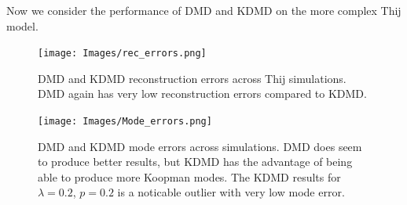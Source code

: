 


\FloatBarrier

Now we consider the performance of DMD and KDMD on the more complex Thij model.


\begin{figure}
    \texttt{[image: Images/rec\_errors.png]}
    \centering
    \caption{DMD and KDMD reconstruction errors across Thij simulations. DMD again
    has very low reconstruction errors compared to KDMD.}
\end{figure}

\begin{figure}
    \texttt{[image: Images/Mode\_errors.png]}
    \centering
    \caption{DMD and KDMD mode errors across simulations. DMD does seem to produce 
    better results, but KDMD has the advantage of being able to produce more Koopman modes. The
    KDMD results for $\lambda=0.2$, $p=0.2$ is a noticable outlier with very low mode error.}
\end{figure}

